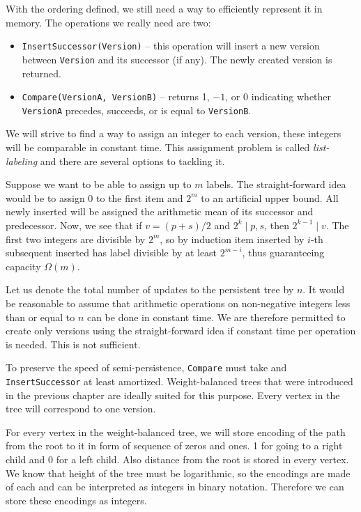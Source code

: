 With the ordering defined, we still need a way to efficiently represent it in memory. The operations we really need are two:

\begin{itemize}
	\item \texttt{InsertSuccessor(Version)} -- this operation will insert a new version between \texttt{Version} and its successor (if any). The newly created version is returned.
	\item \texttt{Compare(VersionA, VersionB)} -- returns 1, $-1$, or 0 indicating whether \texttt{VersionA} precedes, succeeds, or is equal to \texttt{VersionB}.
\end{itemize}

We will strive to find a way to assign an integer to each version, these integers will be comparable in constant time. This assignment problem is called \emph{list-labeling} and there are several options to tackling it.

Suppose we want to be able to assign up to $m$ labels. The straight-forward idea would be to assign 0 to the first item and $2^m$ to an artificial upper bound. All newly inserted will be assigned the arithmetic mean of its successor and predecessor. Now, we see that if $v = (p + s)/2$ and $ 2^k \mid p, s$, then $2^{k-1} \mid v$. The first two integers are divisible by $2^m$, so by induction item inserted by $i$-th subsequent inserted has label divisible by at least $2^{m-i}$, thus guaranteeing capacity $\Omega(m)$. 

Let us denote the total number of updates to the persistent tree by $n$. It would be reasonable to  assume that arithmetic operations on non-negative integers less than or equal to $n$ can be done in constant time. We are therefore permitted to create only  versions using the straight-forward idea if constant time per operation is needed. This is not sufficient.

To preserve the speed of semi-persistence, \texttt{Compare} must take  and \linebreak \texttt{InsertSuccessor}  at least amortized. Weight-balanced trees that were introduced in the previous chapter are ideally suited for this purpose. Every vertex in the tree will correspond to one version.

For every vertex in the weight-balanced tree, we will store encoding of the path from the root to it in form of sequence of zeros and ones. 1 for going to a right child and 0 for a left child. Also distance from the root is stored in every vertex. We know that height of the tree must be logarithmic, so the encodings are made of  each and can be interpreted as integers in binary notation. Therefore we can store these encodings as integers.

